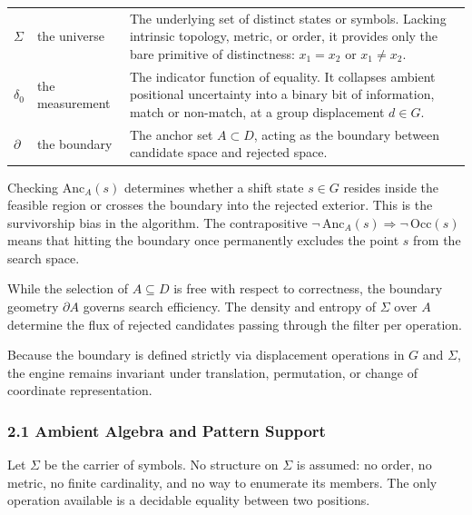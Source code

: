 \begin{center}
  \begin{tabular}{@{}p{2.2em}p{7.5em}p{}@{}}
    \toprule
    \(\Sigma\)   & the universe    &
      The underlying set of distinct states or symbols. Lacking intrinsic topology, metric, or
      order, it provides only the bare primitive of distinctness: \(x_1 = x_2\) or \(x_1 \neq x_2\). \\
    \addlinespace[0.7em]
    \(\delta_0\) & the measurement &
      The indicator function of equality. It collapses ambient positional uncertainty into a
      binary bit of information, match or non-match, at a group displacement \(d \in G\). \\
    \addlinespace[0.7em]
    \(\partial\) & the boundary    &
      The anchor set \(A \subset D\), acting as the boundary between candidate space and rejected
      space. \\
    \bottomrule
  \end{tabular}
\end{center}

Checking \(\mathrm{Anc}_A(s)\) determines whether a shift state \(s \in G\) resides inside the feasible
region or crosses the boundary into the rejected exterior. This is the survivorship bias in the
algorithm. The contrapositive \(\neg\,\mathrm{Anc}_A(s) \Longrightarrow \neg\,\mathrm{Occ}(s)\) means
that hitting the boundary once permanently excludes the point \(s\) from the search space.

While the selection of \(A \subseteq D\) is free with respect to correctness, the boundary geometry
\(\partial A\) governs search efficiency. The density and entropy of \(\Sigma\) over \(A\) determine the
flux of rejected candidates passing through the filter per operation.

Because the boundary is defined strictly via displacement operations in \(G\) and \(\Sigma\), the
engine remains invariant under translation, permutation, or change of coordinate representation.

\subsubsection{2.1 Ambient Algebra and Pattern Support}

Let \(\Sigma\) be the carrier of symbols. No structure on \(\Sigma\) is assumed: no order, no metric, no finite cardinality, and no way to enumerate its members. The only operation available is a decidable equality between two positions.

